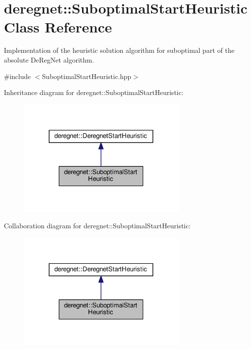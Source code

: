 \hypertarget{classderegnet_1_1SuboptimalStartHeuristic}{}\section{deregnet\+:\+:Suboptimal\+Start\+Heuristic Class Reference}
\label{classderegnet_1_1SuboptimalStartHeuristic}


Implementation of the heuristic solution algorithm for suboptimal part of the absolute De\+Reg\+Net algorithm.  




{\ttfamily \#include $<$Suboptimal\+Start\+Heuristic.\+hpp$>$}



Inheritance diagram for deregnet\+:\+:Suboptimal\+Start\+Heuristic\+:\nopagebreak
\begin{figure}[H]
\begin{center}
\leavevmode
\includegraphics[width=240pt]{classderegnet_1_1SuboptimalStartHeuristic__inherit__graph}
\end{center}
\end{figure}


Collaboration diagram for deregnet\+:\+:Suboptimal\+Start\+Heuristic\+:\nopagebreak
\begin{figure}[H]
\begin{center}
\leavevmode
\includegraphics[width=240pt]{classderegnet_1_1SuboptimalStartHeuristic__coll__graph}
\end{center}
\end{figure}
